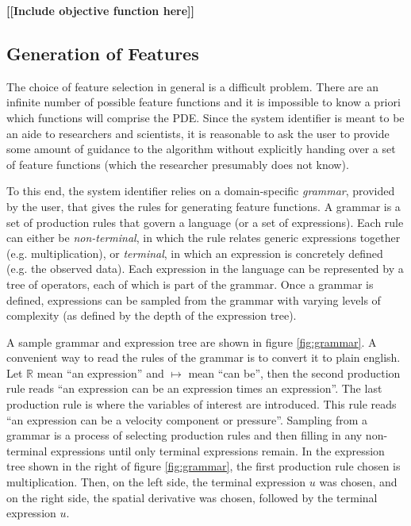 \documentclass{article}
\newcommand{\todo}[1]{\textbf{[[#1]]}}
\begin{document}
\todo{Include objective function here}

\subsection{Generation of Features}
The choice of feature selection in general is a difficult problem. There are an infinite number of possible feature functions and it is impossible to know a priori which functions will comprise the PDE. Since the system identifier is meant to be an aide to researchers and scientists, it is reasonable to ask the user to provide some amount of guidance to the algorithm without explicitly handing over a set of feature functions (which the researcher presumably does not know).

To this end, the system identifier relies on a domain-specific \textit{grammar}, provided by the user, that gives the rules for generating feature functions. A grammar is a set of production rules that govern a language (or a set of expressions). Each rule can either be \textit{non-terminal}, in which the rule relates generic expressions together (e.g. multiplication), or \textit{terminal}, in which an expression is concretely defined (e.g. the observed data). Each expression in the language can be represented by a tree of operators, each of which is part of the grammar. Once a grammar is defined, expressions can be sampled from the grammar with varying levels of complexity (as defined by the depth of the expression tree).

A sample grammar and expression tree are shown in figure \ref{fig:grammar}. A convenient way to read the rules of the grammar is to convert it to plain english. Let $\mathbb{R}$ mean ``an expression'' and $\mapsto$ mean ``can be'', then the second production rule reads ``an expression can be an expression times an expression''. The last production rule is where the variables of interest are introduced. This rule reads ``an expression can be a velocity component or pressure''. Sampling from a grammar is a process of selecting production rules and then filling in any non-terminal expressions until only terminal expressions remain. In the expression tree shown in the right of figure \ref{fig:grammar}, the first production rule chosen is multiplication. Then, on the left side, the terminal expression $u$ was chosen, and on the right side, the spatial derivative was chosen, followed by the terminal expression $u$.
\end{document}
